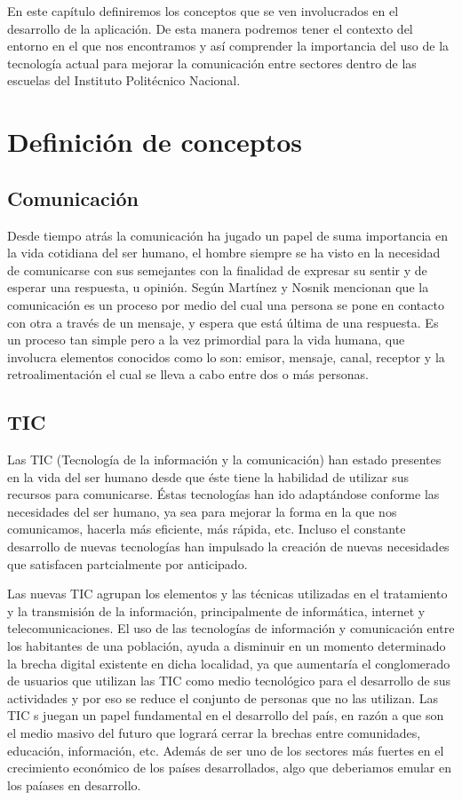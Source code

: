 
En este capítulo definiremos los conceptos que se ven involucrados en el desarrollo de la aplicación. De esta manera podremos tener el contexto del entorno en el que nos encontramos y así comprender la importancia del uso de la tecnología actual para mejorar la comunicación entre sectores dentro de las escuelas del Instituto Politécnico Nacional.


\section{Definición de conceptos}
	\subsection{Comunicación}
	Desde tiempo atrás la comunicación ha jugado un papel de suma importancia en la vida cotidiana del ser humano, el hombre siempre se ha visto en la necesidad de comunicarse con sus semejantes con la finalidad de expresar su sentir y de esperar una respuesta, u opinión. Según Martínez y Nosnik mencionan que la comunicación es un proceso por medio del cual una persona se pone en contacto con otra a través de un mensaje, y espera que está última de una respuesta. \cite{01} Es un proceso tan simple pero a la vez primordial para la vida humana, que involucra elementos conocidos como lo son: emisor, mensaje, canal, receptor y la retroalimentación el cual se lleva a cabo entre dos o más personas.\\

	\subsection{TIC}
	Las TIC (Tecnología de la información y la comunicación) han estado presentes en la vida del ser humano desde que éste tiene la habilidad de utilizar sus recursos para comunicarse. Éstas tecnologías han ido adaptándose conforme las necesidades del ser humano, ya sea para mejorar la forma en la que nos comunicamos, hacerla más eficiente, más rápida, etc. Incluso el constante desarrollo de nuevas tecnologías han impulsado la creación de nuevas necesidades que satisfacen partcialmente por anticipado.
	 
	Las nuevas TIC agrupan los elementos y las técnicas utilizadas en el tratamiento y la transmisión de la información, principalmente de informática, internet y telecomunicaciones. El uso de las tecnologías de información y comunicación entre los habitantes de una población, ayuda a disminuir en un momento determinado la brecha digital existente en dicha localidad, ya que aumentaría el conglomerado de usuarios que utilizan las TIC como medio tecnológico para el desarrollo de sus actividades y por eso se reduce el conjunto de personas que no las utilizan. Las TIC s juegan un papel fundamental en el desarrollo del país, en razón a que son el medio masivo del futuro que logrará cerrar la brechas entre comunidades, educación, información, etc. Además de ser uno de los sectores más fuertes en el crecimiento económico de los países desarrollados, algo que deberiamos emular en los paíases en desarrollo. \cite{02}
	

